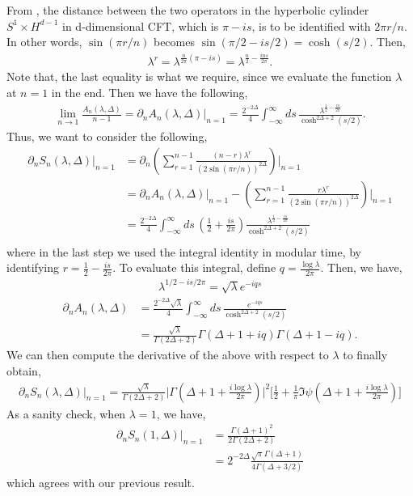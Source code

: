 \documentclass[11pt]{article}
\newcommand{\p}{\partial}
\newcommand{\lb}{\left(}
\newcommand{\rb}{\right)}
\begin{document}
From \cite{S_rosi_2018}, the distance between the two operators in the hyperbolic cylinder $S^1 \times H^{d-1}$ in d-dimensional CFT, which is $\pi - is$, is to be identified with $2\pi r/n$. In other words, $\sin (\pi r/n) $ becomes $\sin( \pi /2 - is/2) = \cosh(s/2)$. Then, 
\begin{align}
    \lambda^r = \lambda^{\frac{n}{2\pi}(\pi - is)} = \lambda^{\frac{n}{2}-\frac{i n s}{2\pi}}.
\end{align}
Note that, the last equality is what we require, since we evaluate the function $\lambda$ at $n=1$ in the end.
Then we have the following,
\begin{align}
    \lim_{n\to1} \frac{A_n(\lambda,\Delta)}{n-1} = \p_n A_n(\lambda,\Delta)|_{n=1} =  \frac{2^{-2\Delta}}{4}\int_{-\infty}^\infty ds \, \frac{\lambda^{\frac{1}{2}- \frac{is}{2\pi}}}{\cosh^{2\Delta +2}(s/2)}.
\end{align}
Thus, we want to consider the following,
\begin{align}
    \p_n S_{n}(\lambda,\Delta)|_{n=1} &= \p_n \lb \sum_{r=1}^{n-1} \frac{(n-r)\lambda^r }{\lb 2\sin(\pi r/n)\rb^{2\Delta}}\rb\Bigg|_{n=1}
    \\&= \p_nA_n(\lambda,\Delta)|_{n=1} - \lb\sum_{r=1}^{n-1}\frac{r\lambda^r}{\lb 2\sin(\pi r/n)\rb^{2\Delta}}\rb\Bigg|_{n=1}\\
    &= \frac{2^{-2\Delta}}{4}\int_{-\infty}^\infty ds\, \lb\frac{1}{2}+ \frac{is}{2\pi}\rb\frac{\lambda^{\frac{1}{2}- \frac{is}{2\pi}}}{\cosh^{2\Delta +2}(s/2)}\\
\end{align}
where in the last step we used the integral identity in modular time, by identifying $r = \frac{1}{2} - \frac{is}{2\pi}$. To evaluate this integral, define $q = \frac{\log \lambda}{2\pi}$. Then, we have,
\begin{align}
    \lambda^{1/2 - is/2\pi} =\sqrt \lambda e^{-iqs}
\end{align}
\begin{align}
    \p_nA_n(\lambda,\Delta) &= \frac{2^{-2\Delta}\sqrt \lambda}{4} \int_{-\infty}^\infty ds \,  \frac{e^{-iqs}}{\cosh^{2\Delta + 2}(s/2)} \\&= \frac{\sqrt{\lambda}}{\Gamma(2\Delta +2)} \Gamma(\Delta + 1 + iq) \Gamma(\Delta + 1 -iq).
\end{align}
We can then compute the derivative of the above with respect to $\lambda$ to finally obtain,
\begin{align}
    \boxed{\p_n S_n(\lambda, \Delta)|_{n=1} = \frac{\sqrt{\lambda}}{\Gamma(2\Delta +2)} \Bigg|\Gamma\lb \Delta + 1 +\frac{i\log \lambda }{2\pi}\rb\Bigg|^2\Bigg[\frac{1}{2}+ \frac{1}{\pi} \Im \psi\lb\Delta + 1 + \frac{i\log \lambda}{2\pi}\rb\Bigg]
    }
\end{align}
As a sanity check, when $\lambda =1$, we have,
\begin{align}
    \p_n S_n(1, \Delta)|_{n=1} &= \frac{\Gamma(\Delta + 1)^2}{2\Gamma(2\Delta + 2)} \\
    &= 2^{-2\Delta}\frac{\sqrt \pi\Gamma(\Delta + 1)}{4\Gamma(\Delta + 3/2)}
\end{align}
which agrees with our previous result. 
\end{document}
